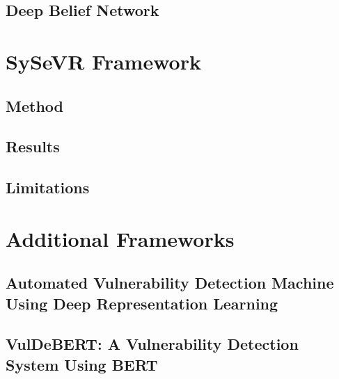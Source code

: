 \documentclass[12pt,twocolumn,letterpaper]{article}
\begin{document}
\subsection{Deep Belief Network}
\label{sub:deep-belief-network}

\section{SySeVR Framework}
\label{sec:sysevr-framework}

\cite{Li22}

\subsection{Method}
\label{sub:method}

\subsection{Results}
\label{sub:results}

\subsection{Limitations}
\label{sub:limitations}

\section{Additional Frameworks}
\label{sec:additional-frameworks}

\subsection{Automated Vulnerability Detection Machine Using Deep Representation Learning}
\label{sub:automated-vulnerability-detection-machine-using-deep-representation-learning}

\cite{Russell18}

\subsection{VulDeBERT: A Vulnerability Detection System Using BERT}
\label{sub:vuldebert}

\cite{Kim22}
\end{document}
